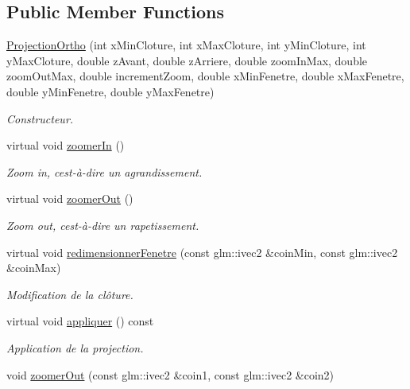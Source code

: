 \subsection*{Public Member Functions}
\begin{DoxyCompactItemize}
\item 
\hyperlink{classvue_1_1_projection_ortho_a06b243688202d77b06d88eea8f97bc1d}{Projection\+Ortho} (int x\+Min\+Cloture, int x\+Max\+Cloture, int y\+Min\+Cloture, int y\+Max\+Cloture, double z\+Avant, double z\+Arriere, double zoom\+In\+Max, double zoom\+Out\+Max, double increment\+Zoom, double x\+Min\+Fenetre, double x\+Max\+Fenetre, double y\+Min\+Fenetre, double y\+Max\+Fenetre)
\begin{DoxyCompactList}\small\item\em Constructeur. \end{DoxyCompactList}\item 
virtual void \hyperlink{classvue_1_1_projection_ortho_a4c0a5d669d4fd937ce3ac1a3fe63dc7b}{zoomer\+In} ()
\begin{DoxyCompactList}\small\item\em Zoom in, c\textquotesingle{}est-\/à-\/dire un agrandissement. \end{DoxyCompactList}\item 
virtual void \hyperlink{classvue_1_1_projection_ortho_a5dd1f08ff6161ccce6b2dfa8dc5dfe40}{zoomer\+Out} ()
\begin{DoxyCompactList}\small\item\em Zoom out, c\textquotesingle{}est-\/à-\/dire un rapetissement. \end{DoxyCompactList}\item 
virtual void \hyperlink{classvue_1_1_projection_ortho_a6fd137b30eb514fcdb6ad02049a10eff}{redimensionner\+Fenetre} (const glm\+::ivec2 \&coin\+Min, const glm\+::ivec2 \&coin\+Max)
\begin{DoxyCompactList}\small\item\em Modification de la clôture. \end{DoxyCompactList}\item 
virtual void \hyperlink{classvue_1_1_projection_ortho_aa2b76e034f890dba75852db6fd0b254c}{appliquer} () const 
\begin{DoxyCompactList}\small\item\em Application de la projection. \end{DoxyCompactList}\item 
void \hyperlink{classvue_1_1_projection_ortho_ae9ef7dc22c268c40f55ef3433fca8d76}{zoomer\+Out} (const glm\+::ivec2 \&coin1, const glm\+::ivec2 \&coin2)

\end{DoxyCompactItemize}
